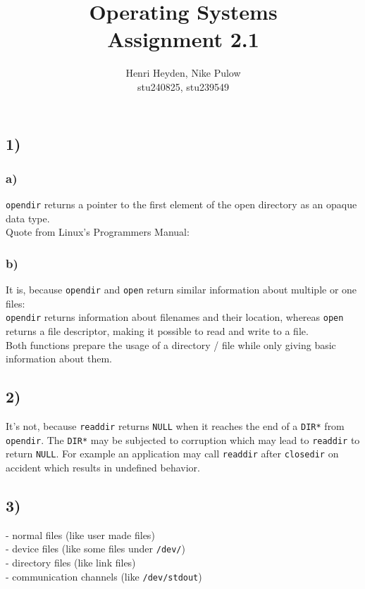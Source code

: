 \documentclass[12pt, a4paper]{article}
\title{Operating Systems\\Assignment 2.1}
\author{Henri Heyden, Nike Pulow \\ \small stu240825, stu239549}
\date{}
\begin{document}
\maketitle

\singlespacing

\subsection*{1)}
\subsubsection*{a)}
\verb|opendir| returns a pointer to the first element of the open directory as an opaque data type.\\
Quote from Linux's Programmers Manual:\\
\subsubsection*{b)}
It is, because \verb|opendir| and \verb|open| return similar information about multiple or one files: \\
\verb|opendir| returns information about filenames and their location, whereas \verb|open| returns a file descriptor, making it possible to read and write to a file. \\
Both functions prepare the usage of a directory / file while only giving basic information about them.
\subsection*{2)}
It's not, because \verb|readdir| returns \verb|NULL| when it reaches the end of a \verb|DIR*| from \verb|opendir|. The \verb|DIR*| may be subjected to corruption which may lead to \verb|readdir| to return \verb|NULL|. For example an application may call \verb|readdir| after \verb|closedir| on accident which results in undefined behavior.
\subsection*{3)}
- normal files (like user made files)\\
- device files (like some files under \verb|/dev/|)\\
- directory files (like link files) \\
- communication channels (like \verb|/dev/stdout|) \pagebreak
\end{document}
